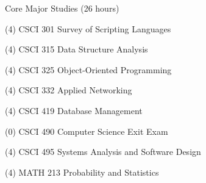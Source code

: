 \begin{reqgroup}{Core Major Studies (26 hours)}
\begin{checklist}
\begin{minipage}{0.5\linewidth}
	\item (4) CSCI 301	Survey of Scripting Languages
	\item (4) CSCI 315	Data Structure Analysis
	\item (4) CSCI 325	Object-Oriented Programming
	\item (4) CSCI 332	Applied Networking
\end{minipage}
\begin{minipage}{0.5\linewidth}
	\item (4) CSCI 419	Database Management
	\item (0) CSCI 490	Computer Science Exit Exam
	\item (4) CSCI 495	Systems Analysis and Software Design
	\item (4) MATH 213	Probability and Statistics
	\end{minipage}
\end{checklist}
\end{reqgroup}

